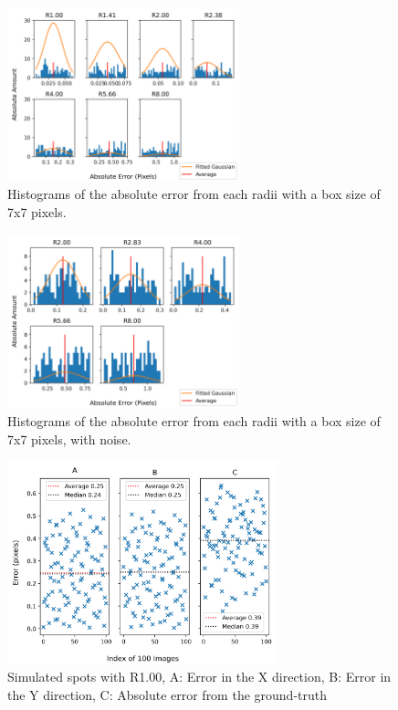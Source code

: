 \documentclass[aps,pra,a4paper,nofootinbib,onecolumn,tightenlines,longbibliography,12pt,amsfonts,amssymb,amsmath,floatfix]{revtex4-2} %
\begin{document}
  \begin{figure}[H]
    \begin{center}
      \includegraphics[width=0.6\textwidth]{project_pics/distro_centriod_7.png}
    \end{center}
    \caption{Histograms of the absolute error from each radii with a box size of 7x7 pixels.}
    \label{fig:box_7}
  \end{figure}

  \begin{figure}[H]
    \begin{center}
      \includegraphics[width=0.6\textwidth]{project_pics/noise_cen_scatter_7.png}
    \end{center}
    \caption{Histograms of the absolute error from each radii with a box size of 7x7 pixels, with noise.}
    \label{fig:box_7_noise}
  \end{figure}

  \begin{figure}[H]
      \begin{center}
        \includegraphics[width=0.7\textwidth]{project_pics/single_test.png}
      \end{center}
      \caption{Simulated spots with R1.00, A: Error in the X direction, B: Error in the Y direction, C: Absolute error from the ground-truth}
      \label{fig:single_test}
    \end{figure}
\end{document}
